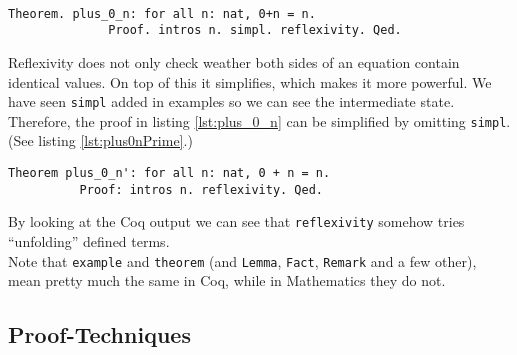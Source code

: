 	   \begin{example} ~\\\vspace{-5mm}
	  	   {\normalfont \begin{lstlisting}[caption=\lstinline!plus_0_n!, label=lst:plus_0_n]
	   		Theorem. plus_0_n: for all n: nat, 0+n = n.
	   		  Proof. intros n. simpl. reflexivity. Qed.
	    	\end{lstlisting}	}	
		\end{example}              
	    \begin{remark}
	    	Reflexivity does not only check weather both sides of an equation contain identical values. 
	    	On top of this it simplifies, which makes it more powerful. 
	    	We have seen \lstinline!simpl! added in examples so we can see the intermediate state.
	    	Therefore, the proof in listing \ref{lst:plus_0_n} can be simplified by omitting \lstinline!simpl!.(See listing \ref{lst:plus0nPrime}.) 
	     \end{remark}	
	
		\begin{lstlisting}[caption={ \lstinline!plus_0_n'!}, label= lst:plus0nPrime]
	    Theorem plus_0_n': for all n: nat, 0 + n = n.
	      Proof: intros n. reflexivity. Qed.	
	    \end{lstlisting}    
	    By looking at the Coq output we can see that \lstinline!reflexivity! somehow tries ``unfolding'' defined terms.\\    
	    Note that \lstinline!example! and \lstinline!theorem! (and \lstinline!Lemma!, \lstinline!Fact!, \lstinline!Remark! and a few other),
	    mean pretty much the same in Coq, while in Mathematics they do not.
	    
	   
	\subsection{Proof-Techniques}
	\label{subsec:proof-techniques}
	    
